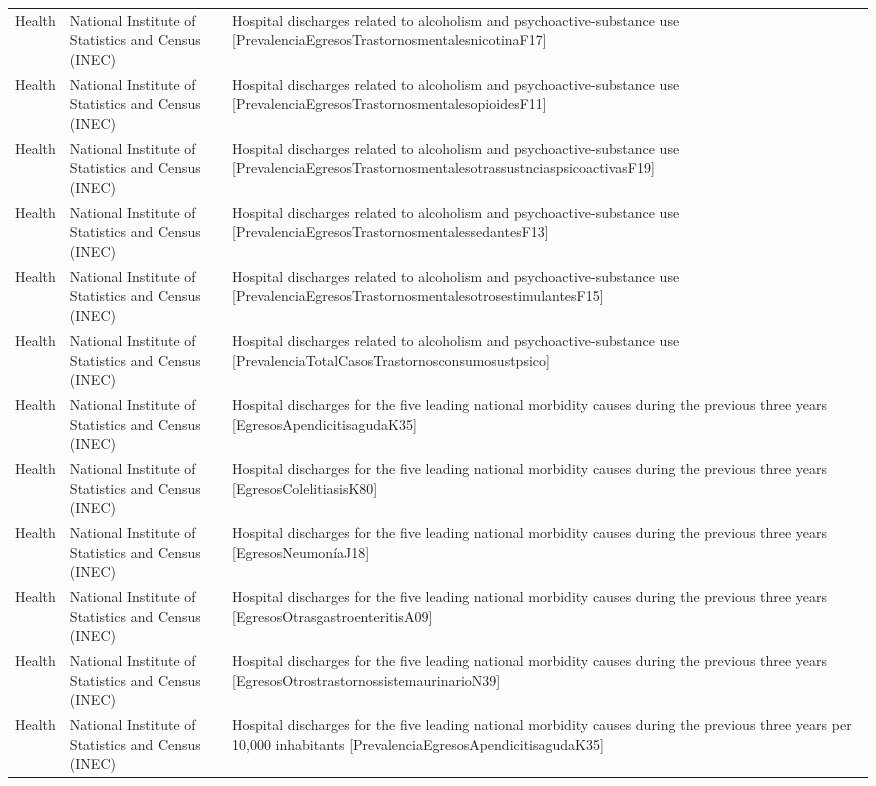 \documentclass[10pt,a4paper]{article}
\begin{document}
\begin{longtable}{@{}>{\raggedright\arraybackslash}p{3.5cm}>{\raggedright\arraybackslash}p{5.6cm}>{\raggedright\arraybackslash}p{\dimexpr\textwidth-9.1cm-4\tabcolsep\relax}@{}}
Health & National Institute of Statistics and Census (INEC) & Hospital discharges related to alcoholism and psychoactive-substance use [PrevalenciaEgresosTrastornosmentalesnicotinaF17]\\
Health & National Institute of Statistics and Census (INEC) & Hospital discharges related to alcoholism and psychoactive-substance use [PrevalenciaEgresosTrastornosmentalesopioidesF11]\\
Health & National Institute of Statistics and Census (INEC) & Hospital discharges related to alcoholism and psychoactive-substance use [PrevalenciaEgresosTrastornosmentalesotrassustnciaspsicoactivasF19]\\
Health & National Institute of Statistics and Census (INEC) & Hospital discharges related to alcoholism and psychoactive-substance use [PrevalenciaEgresosTrastornosmentalessedantesF13]\\
Health & National Institute of Statistics and Census (INEC) & Hospital discharges related to alcoholism and psychoactive-substance use [PrevalenciaEgresosTrastornosmentalesotrosestimulantesF15]\\
Health & National Institute of Statistics and Census (INEC) & Hospital discharges related to alcoholism and psychoactive-substance use [PrevalenciaTotalCasosTrastornosconsumosustpsico]\\
Health & National Institute of Statistics and Census (INEC) & Hospital discharges for the five leading national morbidity causes during the previous three years [EgresosApendicitisagudaK35]\\
Health & National Institute of Statistics and Census (INEC) & Hospital discharges for the five leading national morbidity causes during the previous three years [EgresosColelitiasisK80]\\
Health & National Institute of Statistics and Census (INEC) & Hospital discharges for the five leading national morbidity causes during the previous three years [EgresosNeumon\'{i}aJ18]\\
Health & National Institute of Statistics and Census (INEC) & Hospital discharges for the five leading national morbidity causes during the previous three years [EgresosOtrasgastroenteritisA09]\\
Health & National Institute of Statistics and Census (INEC) & Hospital discharges for the five leading national morbidity causes during the previous three years [EgresosOtrostrastornossistemaurinarioN39]\\
Health & National Institute of Statistics and Census (INEC) & Hospital discharges for the five leading national morbidity causes during the previous three years per 10,000 inhabitants [PrevalenciaEgresosApendicitisagudaK35]\\

\end{longtable}
\end{document}
